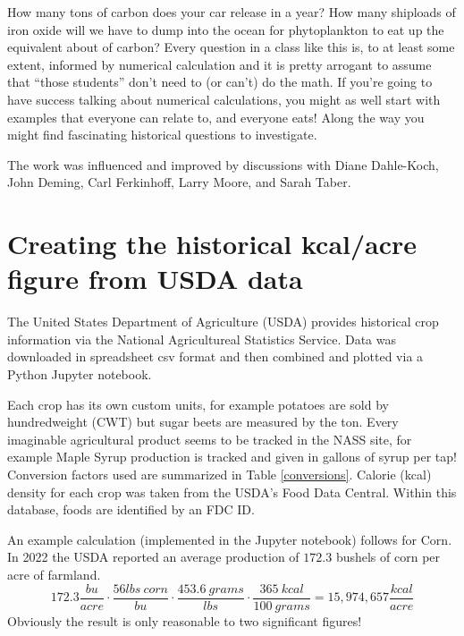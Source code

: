 \documentclass[prb,preprint]{revtex4-2}
\newcommand{\be}{\begin{equation}}
\newcommand{\ee}{\end{equation}}
\begin{document}
How many tons of carbon does your car release in a year? How many shiploads of iron oxide will we have to dump into the ocean for phytoplankton to eat up the equivalent about of carbon?  Every question in a class like this is, to at least some extent, informed by numerical calculation and it is pretty arrogant to assume that ``those students'' don't need to (or can't) do the math.  If you're going to have success talking about numerical calculations, you might as well start with examples that everyone can relate to, and everyone eats!  Along the way you might find fascinating historical questions to investigate.   


\begin{acknowledgments}
The work was influenced and improved by discussions with 
Diane Dahle-Koch, 
John Deming, 
Carl Ferkinhoff, 
Larry Moore, 
and Sarah Taber.
\end{acknowledgments}

\clearpage
\appendix
\section{Creating the historical kcal/acre figure from USDA data}
\label{how_yield_plot_is_made}
The United States Department of Agriculture (USDA) provides historical crop information via the National Agricultureal Statistics Service.\cite{USDA_NASS}
Data was downloaded in spreadsheet csv format and then combined and plotted via a Python Jupyter notebook.   

Each crop has its own custom units, for example potatoes are sold by hundredweight (CWT) but sugar beets are measured by the ton.  
Every imaginable agricultural product seems to be tracked in the NASS site, for example Maple Syrup production is tracked and given in gallons of syrup per tap! 
Conversion factors used are summarized in Table \ref{conversions}.  
Calorie (kcal) density for each crop was taken from the USDA's Food Data Central.\cite{USDA_FDC}
Within this database, foods are identified by an FDC ID.  

An example calculation (implemented in the Jupyter notebook) follows for Corn.  
In 2022 the USDA reported an average production of $172.3$ bushels of corn per acre of farmland.  
\be
172.3\frac{bu}{acre}\cdot\frac{56lbs~corn}{bu}\cdot\frac{453.6~grams}{lbs}\cdot\frac{365~kcal}{100~grams} = 15,974,657 \frac{kcal}{acre}
\label{example_calculation}
\ee
Obviously the result is only reasonable to two significant figures!
\end{document}

